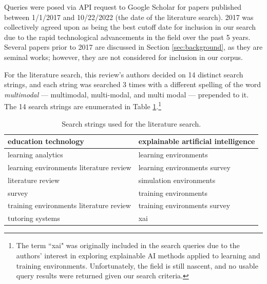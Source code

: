 \documentclass[manuscript,screen,review]{acmart}
\begin{document}
Queries were posed via API request to Google Scholar for papers published between 1/1/2017 and 10/22/2022 (the date of the literature search). 2017 was collectively agreed upon as being the best cutoff date for inclusion in our search due to the rapid technological advancements in the field over the past 5 years. Several papers prior to 2017 are discussed in Section \ref{sec:background}, as they are seminal works; however, they are not considered for inclusion in our corpus. 

For the literature search, this review's authors decided on 14 distinct search strings, and each string was searched 3 times with a different spelling of the word \textit{multimodal} --- multimodal, multi-modal, and multi modal --- prepended to it. The 14 search strings are enumerated in Table \ref{tab:search_terms}.\footnote{The term ``xai" was originally included in the search queries due to the authors' interest in exploring explainable AI methods applied to learning and training environments. Unfortunately, the field is still nascent, and no usable query results were returned given our search criteria.}

\begin{table}[htbp]
    \renewcommand{\arraystretch}{1.3}%
    \centering
    \caption{Search strings used for the literature search.}
    \begin{tabularx}{\linewidth}{l@{\hskip .25in} l@{\hskip .25in}}
    
        \midrule
        education technology & explainable artificial intelligence \\

        \midrule
        learning analytics & learning environments \\
        
        \midrule
        learning environments literature review & learning environments survey \\
    
        \midrule
        literature review & simulation environments \\
        
        \midrule
        survey & training environments \\
        
        \midrule
        training environments literature review & training environments survey \\
        
        \midrule
        tutoring systems & xai \\

        \bottomrule
    \end{tabularx}
    \label{tab:search_terms}
\end{table}
\end{document}
